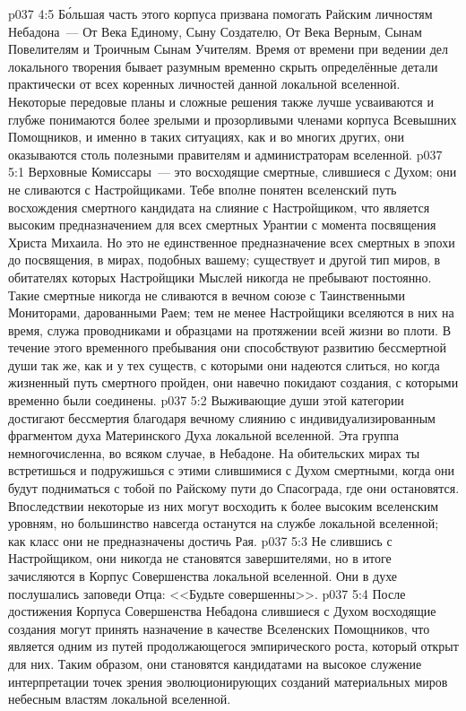 \vs p037 4:5 Б\'ольшая часть этого корпуса призвана помогать Райским личностям Небадона~--- От Века Единому, Сыну Создателю, От Века Верным, Сынам Повелителям и Троичным Сынам Учителям. Время от времени при ведении дел локального творения бывает разумным временно скрыть определённые детали практически от всех коренных личностей данной локальной вселенной. Некоторые передовые планы и сложные решения также лучше усваиваются и глубже понимаются более зрелыми и прозорливыми членами корпуса Всевышних Помощников, и именно в таких ситуациях, как и во многих других, они оказываются столь полезными правителям и администраторам вселенной.
\vs p037 5:1 Верховные Комиссары~--- это восходящие смертные, слившиеся с Духом; они не сливаются с Настройщиками. Тебе вполне понятен вселенский путь восхождения смертного кандидата на слияние с Настройщиком, что является высоким предназначением для всех смертных Урантии с момента посвящения Христа Михаила. Но это не единственное предназначение всех смертных в эпохи до посвящения, в мирах, подобных вашему; существует и другой тип миров, в обитателях которых Настройщики Мыслей никогда не пребывают постоянно. Такие смертные никогда не сливаются в вечном союзе с Таинственными Мониторами, дарованными Раем; тем не менее Настройщики вселяются в них на время, служа проводниками и образцами на протяжении всей жизни во плоти. В течение этого временного пребывания они способствуют развитию бессмертной души так же, как и у тех существ, с которыми они надеются слиться, но когда жизненный путь смертного пройден, они навечно покидают создания, с которыми временно были соединены.
\vs p037 5:2 Выживающие души этой категории достигают бессмертия благодаря вечному слиянию с индивидуализированным фрагментом духа Материнского Духа локальной вселенной. Эта группа немногочисленна, во всяком случае, в Небадоне. На обительских мирах ты встретишься и подружишься с этими слившимися с Духом смертными, когда они будут подниматься с тобой по Райскому пути до Спасограда, где они остановятся. Впоследствии некоторые из них могут восходить к более высоким вселенским уровням, но большинство навсегда останутся на службе локальной вселенной; как класс они не предназначены достичь Рая.
\vs p037 5:3 Не слившись с Настройщиком, они никогда не становятся завершителями, но в итоге зачисляются в Корпус Совершенства локальной вселенной. Они в духе послушались заповеди Отца: <<Будьте совершенны>>.
\vs p037 5:4 \pc После достижения Корпуса Совершенства Небадона слившиеся с Духом восходящие создания могут принять назначение в качестве Вселенских Помощников, что является одним из путей продолжающегося эмпирического роста, который открыт для них. Таким образом, они становятся кандидатами на высокое служение интерпретации точек зрения эволюционирующих созданий материальных миров небесным властям локальной вселенной.
